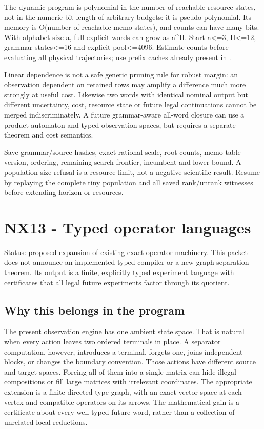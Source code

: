 \documentclass[
  11pt,
  a4paper,
]{report}
\let\nxtexttt\texttt
\renewcommand{\texttt}[1]{\nxtexttt{\seqsplit{#1}}}
\begin{document}
The dynamic program is polynomial in the number of reachable resource
states, not in the numeric bit-length of arbitrary budgets: it is
pseudo-polynomial. Its memory is O(number of reachable memo states), and
counts can have many bits. With alphabet size a, full explicit words can
grow as a\^{}H. Start a\textless=3, H\textless=12, grammar
states\textless=16 and explicit pool\textless=4096. Estimate counts
before evaluating all physical trajectories; use prefix caches already
present in \texttt{protocol\_pool}.

Linear dependence is not a safe generic pruning rule for robust margin:
an observation dependent on retained rows may amplify a difference much
more strongly at useful cost. Likewise two words with identical nominal
output but different uncertainty, cost, resource state or future legal
continuations cannot be merged indiscriminately. A future grammar-aware
all-word closure can use a product automaton and typed observation
spaces, but requires a separate theorem and cost semantics.

Save grammar/source hashes, exact rational scale, root counts,
memo-table version, ordering, remaining search frontier, incumbent and
lower bound. A population-size refusal is a resource limit, not a
negative scientific result. Resume by replaying the complete tiny
population and all saved rank/unrank witnesses before extending horizon
or resources.

\hypertarget{nx13---typed-operator-languages}{%
\chapter{NX13 - Typed operator
languages}\label{nx13---typed-operator-languages}}

Status: proposed expansion of existing exact operator machinery. This
packet does not announce an implemented typed compiler or a new graph
separation theorem. Its output is a finite, explicitly typed experiment
language with certificates that all legal future experiments factor
through its quotient.

\hypertarget{why-this-belongs-in-the-program}{%
\section{Why this belongs in the
program}\label{why-this-belongs-in-the-program}}

The present observation engine has one ambient state space. That is
natural when every action leaves two ordered terminals in place. A
separator computation, however, introduces a terminal, forgets one,
joins independent blocks, or changes the boundary convention. Those
actions have different source and target spaces. Forcing all of them
into a single matrix can hide illegal compositions or fill large
matrices with irrelevant coordinates. The appropriate extension is a
finite directed type graph, with an exact vector space at each vertex
and compatible operators on its arrows. The mathematical gain is a
certificate about every well-typed future word, rather than a collection
of unrelated local reductions.
\end{document}
